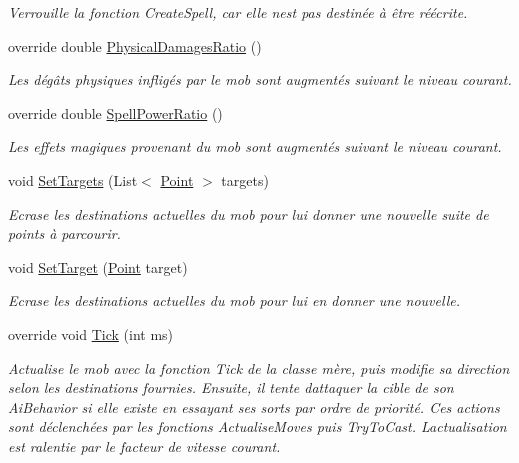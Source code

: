 \begin{DoxyCompactItemize}
\begin{DoxyCompactList}\small\item\em Verrouille la fonction Create\+Spell, car elle n\textquotesingle{}est pas destinée à être réécrite. \end{DoxyCompactList}\item 
override double \hyperlink{class_tentacle_slicers_1_1actors_1_1_mob_a9a27f7eb262346d1e1837df5316823f2}{Physical\+Damages\+Ratio} ()
\begin{DoxyCompactList}\small\item\em Les dégâts physiques infligés par le mob sont augmentés suivant le niveau courant. \end{DoxyCompactList}\item 
override double \hyperlink{class_tentacle_slicers_1_1actors_1_1_mob_abdd7f17fd41371465d7f6b56bf91567c}{Spell\+Power\+Ratio} ()
\begin{DoxyCompactList}\small\item\em Les effets magiques provenant du mob sont augmentés suivant le niveau courant. \end{DoxyCompactList}\item 
void \hyperlink{class_tentacle_slicers_1_1actors_1_1_mob_a4964c017e117b1d5af224f65a16ea127}{Set\+Targets} (List$<$ \hyperlink{class_tentacle_slicers_1_1general_1_1_point}{Point} $>$ targets)
\begin{DoxyCompactList}\small\item\em Ecrase les destinations actuelles du mob pour lui donner une nouvelle suite de points à parcourir. \end{DoxyCompactList}\item 
void \hyperlink{class_tentacle_slicers_1_1actors_1_1_mob_ad3faa313dde3be8458da5efa209e68cb}{Set\+Target} (\hyperlink{class_tentacle_slicers_1_1general_1_1_point}{Point} target)
\begin{DoxyCompactList}\small\item\em Ecrase les destinations actuelles du mob pour lui en donner une nouvelle. \end{DoxyCompactList}\item 
override void \hyperlink{class_tentacle_slicers_1_1actors_1_1_mob_ad3e79cfdf2a28f8eb6363f0567bdcaaf}{Tick} (int ms)
\begin{DoxyCompactList}\small\item\em Actualise le mob avec la fonction Tick de la classe mère, puis modifie sa direction selon les destinations fournies. Ensuite, il tente d\textquotesingle{}attaquer la cible de son Ai\+Behavior si elle existe en essayant ses sorts par ordre de priorité. Ces actions sont déclenchées par les fonctions Actualise\+Moves puis Try\+To\+Cast. L\textquotesingle{}actualisation est ralentie par le facteur de vitesse courant. \end{DoxyCompactList}\end{DoxyCompactItemize}
